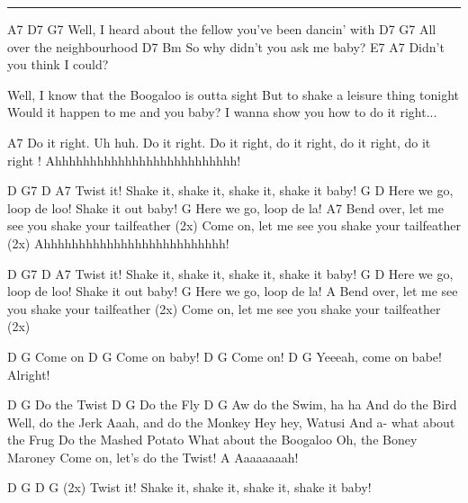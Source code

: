 \noindent\rule{\columnwidth}{1pt}

\begin{lstsong}
A7         D7                                  G7
   Well, I heard about the fellow you've been dancin' with
    D7                 G7
All over the neighbourhood
  D7                     Bm
So why didn't you ask me baby?
E7                  A7
Didn't you think I could?

Well, I know that the Boogaloo is outta sight
But to shake a leisure thing tonight
Would it happen to me and you baby?
I wanna show you how to do it right...
 
A7
Do it right. Uh huh. Do it right. Do it right, do it right, do it right, 
do it right ! Ahhhhhhhhhhhhhhhhhhhhhhhhhh!

D         G7                                     D     A7
Twist it! Shake it, shake it, shake it, shake it baby!
G                        D
Here we go, loop de loo! Shake it out baby!
G
Here we go, loop de la!
A7
Bend over, let me see you shake your tailfeather (2x)
Come on, let me see you shake your tailfeather   (2x)
Ahhhhhhhhhhhhhhhhhhhhhhhhhh!

D         G7                                     D     A7
Twist it! Shake it, shake it, shake it, shake it baby!
G                        D
Here we go, loop de loo! Shake it out baby!
G
Here we go, loop de la!
A
Bend over, let me see you shake your tailfeather (2x)
Come on, let me see you shake your tailfeather   (2x)

     D        G
Come on
        D     G
Come on baby!
     D        G
Come on!
                D              G
Yeeeah, come on babe! Alright!
 
       D      G
Do the Twist
       D      G
Do the Fly
          D           G
Aw do the Swim, ha ha
And do the Bird
Well, do the Jerk
Aaah, and do the Monkey
Hey hey, Watusi      And a-
what about the Frug
Do the Mashed Potato
What about the Boogaloo
Oh, the Boney Maroney
Come on, let's do the Twist!
A
Aaaaaaaah!
 
D         G                                       D    G (2x)
Twist it! Shake it, shake it, shake it, shake it baby!
\end{lstsong}
\newpage

